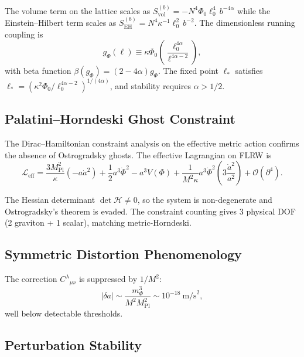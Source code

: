 \documentclass[twocolumn,prd,amsmath,amssymb]{revtex4-2}
\newcommand{\Pl}{M_{\text{Pl}}}
\begin{document}
The volume term on the lattice scales as
$S_{\text{vol}}^{(b)} = -N^4 \Phi_0 \ell_0^4\, b^{-4\alpha}$ while the Einstein--Hilbert
term scales as $S_{\text{EH}}^{(b)} = N^4 \kappa^{-1} \ell_0^2\, b^{-2}$.
The dimensionless running coupling is
\begin{equation}
g_\Phi(\ell) \equiv \kappa \Phi_0 \left(\frac{\ell_0^{4\alpha}}{\ell^{4\alpha-2}}\right),
\label{eq:g-phi}
\end{equation}
with beta function $\beta(g_\Phi) = (2-4\alpha) g_\Phi$.  The fixed point $\ell_*$
satisfies $\ell_* = (\kappa^2 \Phi_0 / \ell_0^{4\alpha-2})^{1/(4\alpha)}$, and stability
requires $\alpha > 1/2$.

\subsection{Palatini--Horndeski Ghost Constraint}
\label{sec:ghost-constraint}

The Dirac--Hamiltonian constraint analysis on the effective metric action confirms the
absence of Ostrogradsky ghosts.  The effective Lagrangian on FLRW is
\begin{equation}
\mathcal{L}_{\text{eff}} = \frac{3M_{\text{Pl}}^2}{\kappa}(-a\dot{a}^2)
+ \frac12 a^3\dot{\Phi}^2 - a^3V(\Phi)
+ \frac{1}{M^2\kappa}a^3\dot{\Phi}^2\left(3\frac{\dot{a}^2}{a^2}\right)
+ \mathcal{O}(\partial^4).
\label{eq:eff-lag-flrw}
\end{equation}

The Hessian determinant $\det\mathcal{H} \neq 0$, so the system is non-degenerate and
Ostrogradsky's theorem is evaded.  The constraint counting gives 3 physical DOF
(2 graviton + 1 scalar), matching metric-Horndeski.

\subsection{Symmetric Distortion Phenomenology}

The correction $C^\lambda{}_{\mu\nu}$ is suppressed by $1/M^2$:
\begin{equation}
|\delta a| \sim \frac{m_\Phi^3}{M^2 \Pl^2} \sim 10^{-18}\ \text{m/s}^2,
\label{eq:delta-a}
\end{equation}
well below detectable thresholds.

\subsection{Perturbation Stability}
\end{document}
